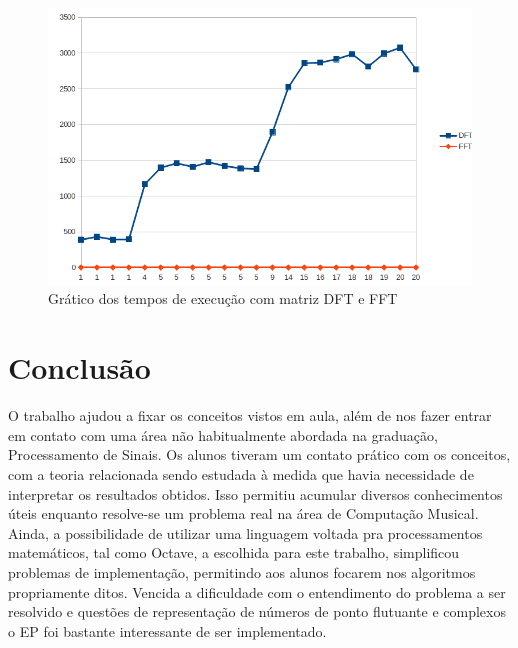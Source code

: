 \documentclass[brazil,times]{abnt}
\begin{document}
	\begin{figure}[h!]
	\begin{center}
	  \includegraphics[width=150mm]{imagens/tempos.png}
	  \caption[Grático dos tempos de execução com matriz DFT e FFT]{Grático dos tempos de execução com matriz DFT e FFT}
	\end{center}
	\end{figure}


\chapter{Conclusão}
	O trabalho ajudou a fixar os conceitos vistos em aula, além de nos fazer entrar em contato com uma área não habitualmente abordada na graduação, Processamento de Sinais. Os alunos tiveram um contato prático com os conceitos, com a teoria relacionada sendo estudada à medida que havia necessidade de interpretar os resultados obtidos. Isso permitiu acumular diversos conhecimentos úteis enquanto resolve-se um problema real na área de Computação Musical. Ainda, a possibilidade de utilizar uma linguagem voltada pra processamentos matemáticos, tal como Octave, a escolhida para este trabalho, simplificou problemas de implementação, permitindo aos alunos focarem nos algoritmos propriamente ditos. Vencida a dificuldade com o entendimento do problema a ser resolvido e questões de representação de números de ponto flutuante e complexos o EP foi bastante interessante de ser implementado.
	
\nocite{*}


\end{document}
